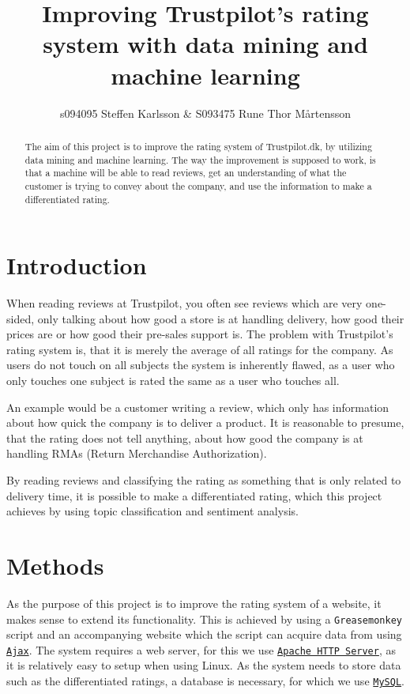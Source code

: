 \documentclass[10pt]{IEEEtran}
\title{Improving Trustpilot's rating system with data mining and machine learning}
\author{s094095 Steffen Karlsson \& S093475 Rune Thor Mårtensson}
\begin{document}
\maketitle

\begin{abstract}
The aim of this project is to improve the rating system of Trustpilot.dk, by utilizing data mining and machine learning. The way the improvement is supposed to work, is that a machine will be able to read reviews, get an understanding of what the customer is trying to convey about the company, and use the information to make a differentiated rating.
\end{abstract}

\section{Introduction}
When reading reviews at Trustpilot, you often see reviews which are very one-sided, only talking about how good a store is at handling delivery, how good their prices are or how good their pre-sales support is. The problem with Trustpilot's rating system is, that it is merely the average of all ratings for the company. As users do not touch on all subjects the system is inherently flawed, as a user who only touches one subject is rated the same as a user who touches all.

An example would be a customer writing a review, which only has information about how quick the company is to deliver a product. It is reasonable to presume, that the rating does not tell anything, about how good the company is at handling RMAs (Return Merchandise Authorization). 

By reading reviews and classifying the rating as something that is only related to delivery time, it is possible to make a differentiated rating, which this project achieves by using topic classification and sentiment analysis.

\section{Methods}
As the purpose of this project is to improve the rating system of a website, it makes sense to extend its functionality. This is achieved by using a \texttt{Greasemonkey}\cite{GreaseMonkey} script and an accompanying website which the script can acquire data from using \href{http://en.wikipedia.org/wiki/Ajax_(programming)}{\texttt{Ajax}}.
The system requires a web server, for this we use \href{http://httpd.apache.org/}{\texttt{Apache HTTP Server}}, as it is relatively easy to setup when using Linux. As the system needs to store data such as the differentiated ratings, a database is necessary, for which we use \href{http://www.mysql.com/}{\texttt{MySQL}}.
\end{document}
